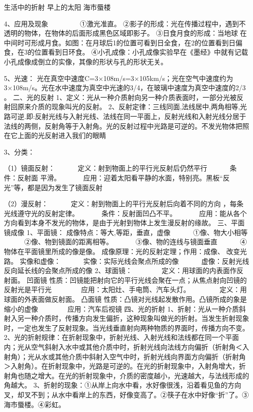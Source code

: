 \documentclass[12pt]{exam}
\begin{document}
生活中的折射  早上的太阳  海市蜃楼



4、应用及现象
　　
　　①激光准直。
②影子的形成：光在传播过程中，遇到不透明的物体，在物体的后面形成黑色区域即影子。
③日食月食的形成：当地球 在中间时可形成月食。如图：在月球后1的位置可看到日全食，在2的位置看到日偏食，在3的位置看到日环食。
④小孔成像：小孔成像实验早在《墨经》中就有记载小孔成像成倒立的实像，其像的形状与孔的形状无关。

5、光速：
光在真空中速度C=3×108m/s=3×105km/s；光在空气中速度约为3×108m/s。光在水中速度为真空中光速的3/4，在玻璃中速度为真空中速度的2/3 。
二、光的反射
1、定义：光从一种介质射向另一种介质表面时，一部分光被反射回原来介质的现象叫光的反射。
2、反射定律：三线同面,法线居中,两角相等,光路可逆.即:反射光线与入射光线、法线在同一平面上，反射光线和入射光线分居于法线的两侧，反射角等于入射角。光的反射过程中光路是可逆的。不发光物体把照在它上面的光反射进入我们的眼睛

3、分类：

（1）镜面反射：
　　　定义：射到物面上的平行光反射后仍然平行
　　　条件：反射面 平滑。
　　　应用：迎着太阳看平静的水面，特别亮。黑板“反光”等，都是因为发生了镜面反射

（2）漫反射：
　　　定义：射到物面上的平行光反射后向着不同的方向 ，每条光线遵守光的反射定律。
　　　条件：反射面凹凸不平。
　　　应用：能从各个方向看到本身不发光的物体，是由于光射到物体上发生漫反射的缘故。
三、平面镜成像
1、平面镜：
成像特点：等大,等距，垂直，虚像
　　　①像、物大小相等
　　　②像、物到镜面的距离相等。
　　　③像、物的连线与镜面垂直
　　　④物体在平面镜里所成的像是像。
成像原理：光的反射定理；作用：成像、 改变光路。
实像和虚像：
　　　实像：实际光线会聚点所成的像
　　　虚像：反射光线反向延长线的会聚点所成的像
2、球面镜：
　　　　定义：用球面的内表面作反射面。
凹面镜  性质：凹镜能把射向它的平行光线会聚在一点；从焦点射向凹镜的反射光是平行光
　　　　应用：太阳灶、手电筒、汽车头灯。
　　　　定义：用球面的外表面做反射面。
凸面镜  性质：凸镜对光线起发散作用。凸镜所成的象是缩小的虚像
　　　　应用：汽车后视镜
四、光的折射
1、折射：光从一种介质斜射入另一种介质时，传播方向发生偏折，这种现象叫做光的折射。当发生折射现象时，一定也发生了反射现象。当光线垂直射向两种物质的界面时，传播方向不变。
2、光的折射规律：在折射现象中，折射光线、入射光线和法线都在同一个平面内；光从空气斜射入水中或其他介质中时，折射光线向法线方向偏折（折射角＜入射角）；光从水或其他介质中斜射入空气中时，折射光线向界面方向偏折（折射角＞入射角）。在折射现象中，光路是可逆的。在光的折射现象中，入射角增大，折射角也随之增大。在光的折射现象中，介质的密度越小，光速越大，与法线形成的角越大。
3、折射的现象：①从岸上向水中看，水好像很浅，沿着看见鱼的方向叉，却叉不到；从水中看岸上的东西，好像变高了。②筷子在水中好像“折”了。③海市蜃楼。④彩虹。
\end{document}
